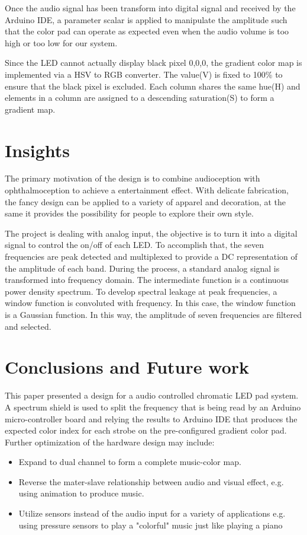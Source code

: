 \documentclass[12pt,a4paper,journal]{IEEEtran}
\begin{document}
Once the audio signal has been transform into digital signal and received by the Arduino IDE, a parameter scalar is applied to manipulate the amplitude such that the color pad can operate as expected even when the audio volume is too high or too low for our system.

Since the LED cannot actually display black pixel {0,0,0}, the gradient color map is implemented via a HSV to RGB converter. The value(V) is fixed to 100\% to ensure that the black pixel is excluded. Each column shares the same hue(H) and elements in a column are assigned to a descending saturation(S) to form a gradient map.
\section{Insights}
The primary motivation of the design is to combine audioception with ophthalmoception to achieve a entertainment effect. With delicate fabrication, the fancy design can be applied to a variety of apparel and decoration, at the same it provides the possibility for people to explore their own style.

The project is dealing with analog input, the objective is to turn it into a digital signal to control the on/off of each LED. To accomplish that, the seven frequencies are peak detected and multiplexed to provide a DC representation of the amplitude of each band. During the process, a standard analog signal is transformed into frequency domain. The intermediate function is a continuous power density spectrum. To develop spectral leakage at peak frequencies, a window function is convoluted with frequency. In this case, the window function is a Gaussian function. In this way, the amplitude of seven frequencies are filtered and selected.
\section{Conclusions and Future work}
This paper presented a design for a audio controlled chromatic LED pad system. A spectrum shield is used to split the frequency that is being read by an Arduino micro-controller board and relying the results to Arduino IDE that produces the expected color index for each strobe on the pre-configured gradient color pad.
Further optimization of the hardware design may include: 
\begin{itemize}
\item Expand to dual channel to form a complete music-color map. 
\item Reverse the mater-slave relationship between audio and visual effect, e.g. using animation to produce music.
\item Utilize sensors instead of the audio input for a variety of applications e.g. using pressure sensors to play a "colorful" music just like playing a piano
\end{itemize}
\end{document}
